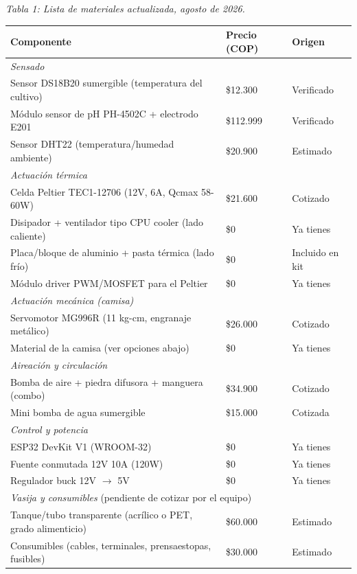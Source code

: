 \documentclass[11pt,a4paper]{article}
\begin{document}
\begin{center}
\footnotesize
\textit{Tabla 1: Lista de materiales actualizada, agosto de 2026.}\\[4pt]
\begin{tabular}{p{6.3cm}p{2.3cm}p{2.6cm}}
\toprule
\textbf{Componente} & \textbf{Precio (COP)} & \textbf{Origen} \\
\midrule
\multicolumn{3}{l}{\textit{Sensado}} \\
Sensor DS18B20 sumergible (temperatura del cultivo) & \$12.300 & Verificado \\
Módulo sensor de pH PH-4502C + electrodo E201 & \$112.999 & Verificado \\
Sensor DHT22 (temperatura/humedad ambiente) & \$20.900 & Estimado \\
\midrule
\multicolumn{3}{l}{\textit{Actuación térmica}} \\
Celda Peltier TEC1-12706 (12V, 6A, Qcmax 58-60W) & \$21.600 & Cotizado \\
Disipador + ventilador tipo CPU cooler (lado caliente) & \$0 & Ya tienes \\
Placa/bloque de aluminio + pasta térmica (lado frío) & \$0 & Incluido en kit \\
Módulo driver PWM/MOSFET para el Peltier & \$0 & Ya tienes \\
\midrule
\multicolumn{3}{l}{\textit{Actuación mecánica (camisa)}} \\
Servomotor MG996R (11 kg-cm, engranaje metálico) & \$26.000 & Cotizado \\
Material de la camisa (ver opciones abajo) & \$0 & Ya tienes \\
\midrule
\multicolumn{3}{l}{\textit{Aireación y circulación}} \\
Bomba de aire + piedra difusora + manguera (combo) & \$34.900 & Cotizado \\
Mini bomba de agua sumergible & \$15.000 & Cotizada \\
\midrule
\multicolumn{3}{l}{\textit{Control y potencia}} \\
ESP32 DevKit V1 (WROOM-32) & \$0 & Ya tienes \\
Fuente conmutada 12V 10A (120W) & \$0 & Ya tienes \\
Regulador buck 12V $\to$ 5V & \$0 & Ya tienes \\
\midrule
\multicolumn{3}{l}{\textit{Vasija y consumibles} (pendiente de cotizar por el equipo)} \\
Tanque/tubo transparente (acrílico o PET, grado alimenticio) & \$60.000 & Estimado \\
Consumibles (cables, terminales, prensaestopas, fusibles) & \$30.000 & Estimado \\
\bottomrule
\end{tabular}
\end{center}
\end{document}
